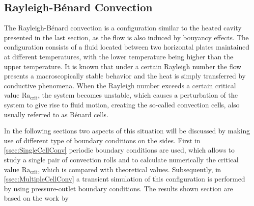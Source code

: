 \subsection{Rayleigh-Bénard Convection}

The Rayleigh-Bénard convection is a configuration similar to the heated cavity presented in the last section, as the flow is also induced by bouyancy effects. The configuration consists of a fluid located between two horizontal plates maintained at different temperatures, with the lower temperature being higher than the upper temperature. It is known that under a certain Rayleigh number the flow presents a macroscopically stable behavior and the heat is simply transferred by conductive phenomena. When the Rayleigh number exceeds a certain critical value $\text{Ra}_{\text{crit}}$, the system becomes unstable, which causes a perturbation of the system to give rise to fluid motion, creating the so-called convection cells, also usually referred to as Bénard cells.

In the following sections two aspects of this situation will be discussed by making use of different type of boundary conditions on the sides. First in \cref{ssec:SingleCellConv} periodic boundary conditions are used, which allows  to study a single pair of convection rolls and to calculate numerically the critical value $\text{Ra}_{\text{crit}}$, which is compared with theoretical values. Subsequently, in \cref{ssec:MultipleCellConv} a transient simulation of this configuration is performed by using pressure-outlet boundary conditions. The results shown section are based on the work by \cite{miaoHighOrderSimulationLowMachFlows2022} %

